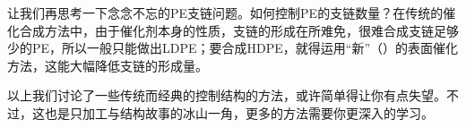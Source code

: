 让我们再思考一下念念不忘的PE支链问题。如何控制PE的支链数量？在传统的催化合成方法中，由于催化剂本身的性质，支链的形成在所难免，很难合成支链足够少的PE，所以一般只能做出LDPE；要合成HDPE，就得运用“新”（）的表面催化方法，这能大幅降低支链的形成量。

以上我们讨论了一些传统而经典的控制结构的方法，或许简单得让你有点失望。不过，这也是只加工与结构故事的冰山一角，更多的方法需要你更深入的学习。


